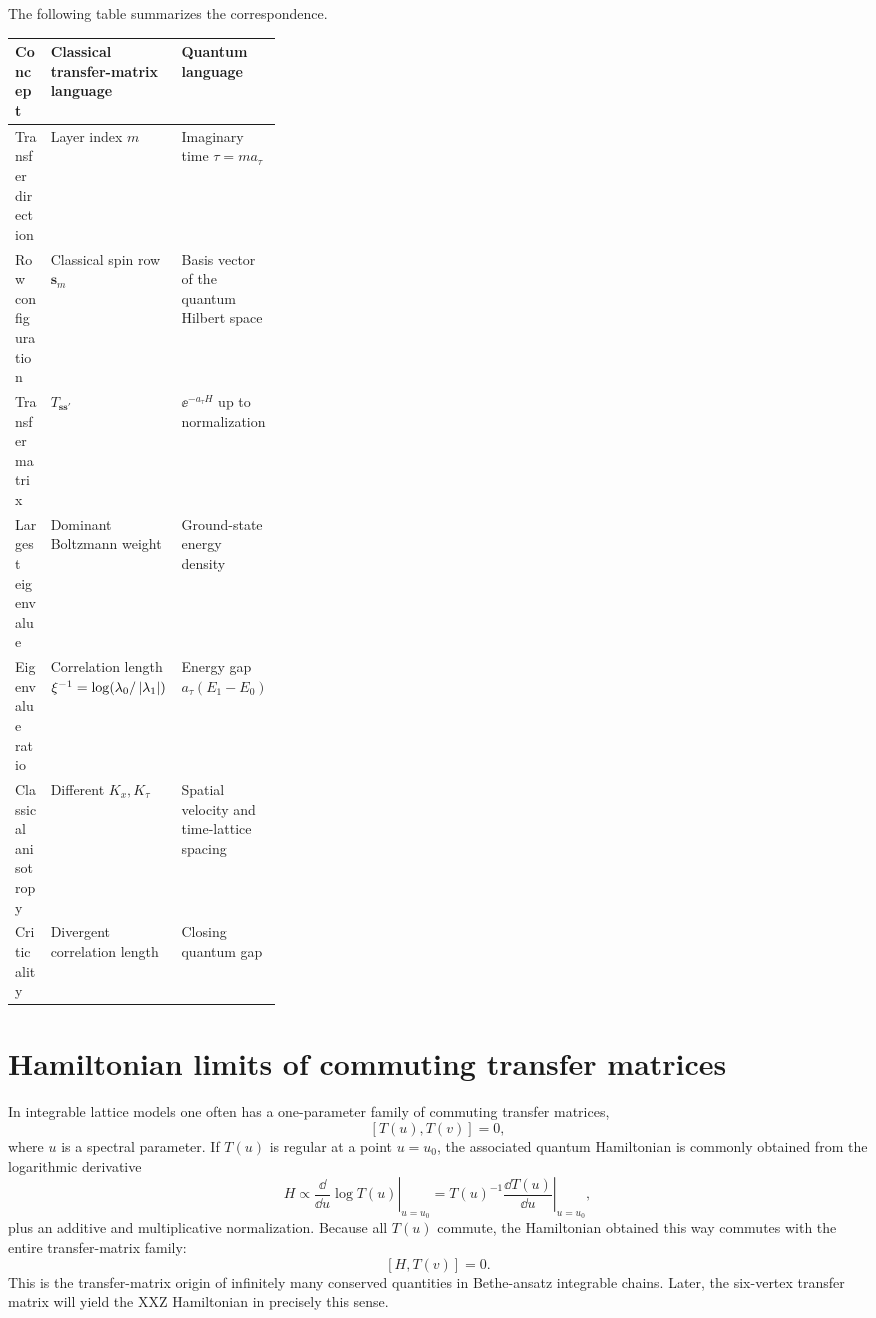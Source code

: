 The following table summarizes the correspondence.
\begin{center}
\begin{tabularx}{0.95\linewidth}{@{}L{0.31\linewidth}Y Y@{}}
\toprule
Concept & Classical transfer-matrix language & Quantum language \\
\midrule
Transfer direction & Layer index $m$ & Imaginary time $\tau=m a_\tau$ \\
Row configuration & Classical spin row $\bm{s}_m$ & Basis vector of the quantum Hilbert space \\
Transfer matrix & $T_{\bm{s}\bm{s}'}$ & $\ee^{-a_\tau H}$ up to normalization \\
Largest eigenvalue & Dominant Boltzmann weight & Ground-state energy density \\
Eigenvalue ratio & Correlation length $\xi^{-1}=\log(\lambda_0/\left|\lambda_1\right|)$ & Energy gap $a_\tau(E_1-E_0)$ \\
Classical anisotropy & Different $K_x,K_\tau$ & Spatial velocity and time-lattice spacing \\
Criticality & Divergent correlation length & Closing quantum gap \\
\bottomrule
\end{tabularx}
\end{center}

\section{Hamiltonian limits of commuting transfer matrices}
\label{sec:hamiltonian-limits-commuting-transfer-matrices}

In integrable lattice models one often has a one-parameter family of commuting
transfer matrices,
\begin{equation}
\label{eq:commuting-transfer-matrices}
    [T(u),T(v)]=0,
\end{equation}
where $u$ is a spectral parameter. If $T(u)$ is regular at a point $u=u_0$, the
associated quantum Hamiltonian is commonly obtained from the logarithmic
derivative
\begin{equation}
\label{eq:logarithmic-derivative-transfer-matrix}
    H
    \propto
    \left.
    \frac{\dd}{\dd u}\log T(u)
    \right|_{u=u_0}
    =
    \left.
    T(u)^{-1}\frac{\dd T(u)}{\dd u}
    \right|_{u=u_0},
\end{equation}
plus an additive and multiplicative normalization. Because all $T(u)$ commute,
the Hamiltonian obtained this way commutes with the entire transfer-matrix family:
\begin{equation}
\label{eq:hamiltonian-commutes-transfer-family}
    [H,T(v)]=0.
\end{equation}
This is the transfer-matrix origin of infinitely many conserved quantities in
Bethe-ansatz integrable chains. Later, the six-vertex transfer matrix will yield
the XXZ Hamiltonian in precisely this sense.

